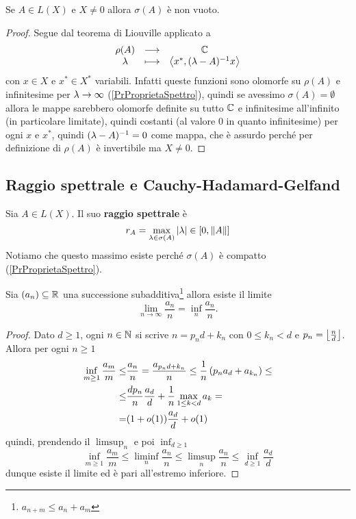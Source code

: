 \begin{proposition}[]\label{PrSpettroENonVuoto}
Se $A\in L(X)$ e $X\neq 0$ allora $\sigma(A)$ \`e non vuoto.
\end{proposition}
\begin{proof}
Segue dal teorema di Liouville applicato a
\[\begin{array}{ccc} {\rho(A)} & \longrightarrow & {\mathbb{C}}\\ {\lambda} & \longmapsto & {\left\langle {x^\ast,(\lambda-A)^{-1}x}\right\rangle} \end{array}\]
con $x\in X$ e $x^\ast\in X^\ast$ variabili. Infatti queste funzioni sono olomorfe su $\rho(A)$ e infinitesime per $\lambda\to\infty$ (\ref{PrProprietaSpettro}), quindi se avessimo $\sigma(A)=\emptyset$ allora le mappe sarebbero olomorfe definite su tutto $\mathbb{C}$ e infinitesime all'infinito (in particolare limitate), quindi costanti (al valore $0$ in quanto infinitesime) per ogni $x$ e $x^\ast$, quindi $(\lambda-A)^{-1}=0$ come mappa, che \`e assurdo perch\'e per definizione di $\rho(A)$ \`e invertibile ma $X\neq 0$.
\end{proof}

\subsection{Raggio spettrale e Cauchy-Hadamard-Gelfand}
\begin{definition}
Sia $A\in L(X)$. Il suo \textbf{raggio spettrale} \`e
\[r_A=\max_{\lambda\in \sigma(A)}\left|{\lambda}\right|\in [0,\left\Vert{A}\right\Vert]\]
Notiamo che questo massimo esiste perch\'e $\sigma(A)$ \`e compatto (\ref{PrProprietaSpettro}).
\end{definition}




\begin{lemma}[]\label{LmSuccessioneSubadditivaConvergeSeDivisaPerIndice}
Sia $(a_n)\subseteq\mathbb{R}$ una successione subadditiva\footnote{$a_{n+m}\leq a_n+a_m$} allora esiste il limite
\[\lim_{n\to\infty}\frac{a_n}n=\inf_n\frac{a_n}n.\] 
\end{lemma}
\begin{proof}
Dato $d\geq 1$, ogni $n\in \mathbb{N}$ si scrive $n=p_nd+k_n$ con $0\leq k_n<d$ e $p_n=\left\lfloor {\frac nd}\right\rfloor$. Allora per ogni $n\geq 1$
\begin{align*}
    \inf_{m\geq 1}\frac{a_m}m\leq& \frac{a_n}n=\frac{a_{p_n d+k_n}}{n}\leq \frac1n\left({p_n a_d+a_{k_n}}\right)\leq\\
    \leq&\frac{dp_n}n \frac{a_d}d+\frac1n\max_{1\leq k<d}a_k=\\
    =&(1+o(1))\frac{a_d}d+o(1)
\end{align*}
quindi, prendendo il $\limsup_{n}$ e poi $\inf_{d\geq 1}$
\[\inf_{m\geq 1}\frac{a_m}m\leq\liminf_{n}\frac{a_n}n\leq \limsup_{n}\frac{a_n}n\leq \inf_{d\geq 1}\frac{a_d}d\]
dunque esiste il limite ed \`e pari all'estremo inferiore.
\end{proof}


